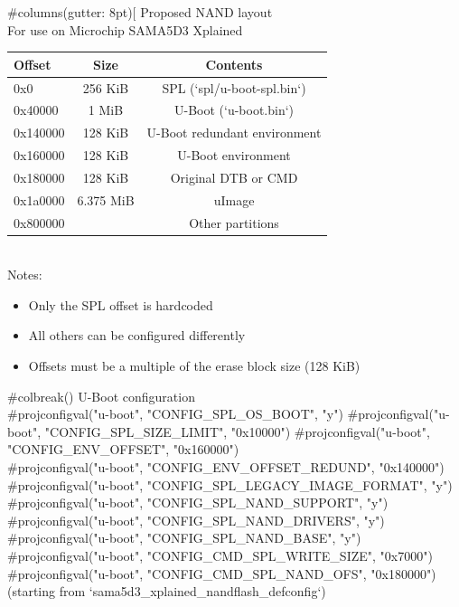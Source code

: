 #columns(gutter: 8pt)[
	\footnotesize
	Proposed NAND layout\\
        For use on Microchip SAMA5D3 Xplained\\
        \vspace{0.5cm}
	{\fontsize{7}{10}\selectfont
	\begin{tabular}{| l | c | c |}
	\hline
	Offset & Size & Contents \\
	\hline
	0x0 & 256 KiB & SPL (`spl/u-boot-spl.bin`)\\
	0x40000 & 1 MiB & U-Boot (`u-boot.bin`) \\
	0x140000 & 128 KiB & U-Boot redundant environment \\
	0x160000 & 128 KiB & U-Boot environment \\
	0x180000 & 128 KiB & Original DTB or CMD \\
	0x1a0000 & 6.375 MiB & uImage \\
	0x800000 & & Other partitions \\
	\hline
	\end{tabular}
	}\\
        \vspace{0.5cm}
	Notes:
	\begin{itemize}
	   \item Only the SPL offset is hardcoded
	   \item All others can be configured differently
	   \item Offsets must be a multiple of the erase block size (128 KiB)
	\end{itemize}
     #colbreak()
	\footnotesize
	U-Boot configuration\\
	#projconfigval("u-boot", "CONFIG_SPL_OS_BOOT", "y")
	#projconfigval("u-boot", "CONFIG_SPL_SIZE_LIMIT", "0x10000")
	#projconfigval("u-boot", "CONFIG_ENV_OFFSET", "0x160000")\\
	#projconfigval("u-boot", "CONFIG_ENV_OFFSET_REDUND", "0x140000")\\
	#projconfigval("u-boot", "CONFIG_SPL_LEGACY_IMAGE_FORMAT", "y")\\
	#projconfigval("u-boot", "CONFIG_SPL_NAND_SUPPORT", "y")\\
	#projconfigval("u-boot", "CONFIG_SPL_NAND_DRIVERS", "y")\\
	#projconfigval("u-boot", "CONFIG_SPL_NAND_BASE", "y")\\
	#projconfigval("u-boot", "CONFIG_CMD_SPL_WRITE_SIZE", "0x7000")\\
	#projconfigval("u-boot", "CONFIG_CMD_SPL_NAND_OFS", "0x180000")\\
        (starting from
        `sama5d3_xplained_nandflash_defconfig`)

